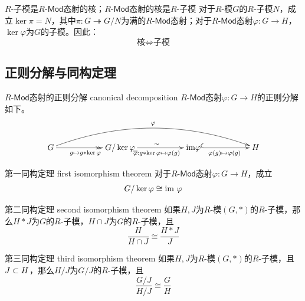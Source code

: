 \begin{theorem}{$R$-子模是$R$-$\mathsf{Mod}$态射的核；$R$-$\mathsf{Mod}$态射的核是$R$-子模}
	对于$R$-模$G$的$R$-子模$N$，成立$\ker\pi=N$，其中$\pi:G\twoheadrightarrow G/N$为满的$R$-$\mathsf{Mod}$态射；对于$R$-$\mathsf{Mod}$态射$\varphi:G\to H$，$\ker\varphi$为$G$的子模。因此：
	$$
	\text{核}\iff\text{子模}
	$$
\end{theorem}

\subsection{正则分解与同构定理}

\begin{definition}{$R$-$\mathsf{Mod}$态射的正则分解 canonical decomposition}
	$R$-$\mathsf{Mod}$态射$\varphi:G\to H$的正则分解如下。
	$$
	\xymatrix@=13ex{
		G \ar@/^2pc/[rrr]^{\varphi} \ar@{->>}[r]_{g\mapsto g*\ker\varphi} & G/\ker\varphi \ar@{->}[r]_{\overline{\varphi}:g*\ker\varphi\mapsto \varphi(g)}^{\sim} & \mathrm{im}\varphi \ar@{^{(}->}[r]_{\varphi(g)\mapsto \varphi(g)} & H
	}
	$$
\end{definition}

\begin{definition}{第一同构定理 first isomorphism theorem}
	对于$R$-$\mathsf{Mod}$态射$\varphi:G\to H$，成立
	$$
	G/\ker\varphi \cong \text{im } \varphi
	$$
\end{definition}

\begin{definition}{第二同构定理 second isomorphism theorem}
	如果$H,J$为$R$-模$(G,*)$的$R$-子模，那么$H*J$为$G$的$R$-子模，$H\cap J$为$G$的$R$-子模，且
	$$
	\frac{H}{H\cap J}\cong\frac{H*J}{J}
	$$
\end{definition}

\begin{definition}{第三同构定理 third isomorphism theorem}
	如果$H,J$为$R$-模$(G,*)$的$R$-子模，且$J\subset H$，那么$H/J$为$G/J$的$R$-子模，且
	$$
	\frac{G/J}{H/J}\cong\frac{G}{H}
	$$
\end{definition}

% 

